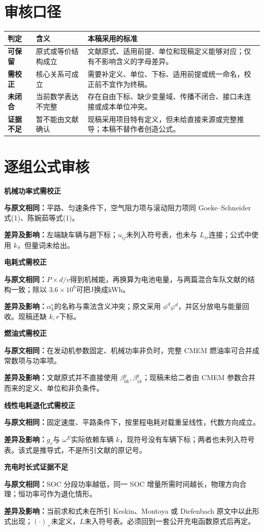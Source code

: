 \documentclass[UTF8,11pt,a4paper,fontset=none]{ctexart}
\newcommand{\pass}{\textcolor{okgreen}{\textbf{可保留}}}
\newcommand{\revise}{\textcolor{warnorange}{\textbf{需校正}}}
\newcommand{\fail}{\textcolor{badred}{\textbf{未闭合}}}
\newcommand{\unknown}{\textbf{证据不足}}
\newcommand{\audititem}[4]{%
  \noindent\textbf{#1}\hfill #2\par
  \noindent\textbf{与原文相同：}#3\par
  \noindent\textbf{差异及影响：}#4\par\medskip
}
\begin{document}
\section{审核口径}

\begin{longtable}{P{0.16\textwidth}P{0.19\textwidth}P{0.56\textwidth}}
\toprule
判定 & 含义 & 本稿采用的标准\\
\midrule
\endhead
\pass & 原式或等价结构成立 & 文献原式、适用前提、单位和现稿定义能够对应；仅有不影响含义的字母差异。\\
\revise & 核心关系可成立 & 需要补定义、单位、下标、适用前提或统一命名，校正前不宜作为终稿。\\
\fail & 当前数学表达不完整 & 存在自由下标、缺少变量域、传播不闭合、接口未连接或成本单位冲突。\\
\unknown & 暂不能由文献确认 & 现稿采用项目特有定义，但未给直接来源或完整推导；本稿不替作者创造公式。\\
\bottomrule
\end{longtable}

\section{逐组公式审核}

\audititem{机械功率式}{\revise}
{平路、匀速条件下，空气阻力项与滚动阻力项同 Goeke--Schneider 式(1)、陈婉茹等式(1)。}
{左端缺车辆与趟下标；$u_{ij}$未列入符号表，也未与 $L_{ir}$连接；公式中使用 $k$，但量词未给出。}

\audititem{电耗式}{\revise}
{$P\times d/v$得到机械能，再换算为电池电量，与两篇混合车队文献的结构一致；除以 $3.6\times10^6$可把J换成kWh。}
{$\alpha_k^e$的名称与乘法含义冲突；原文采用 $\phi^d\varphi^d$，并区分放电与能量回收。现稿还缺 $k,r$下标。}

\audititem{燃油式}{\revise}
{在发动机参数固定、机械功率非负时，完整 CMEM 燃油率可合并成常数项与功率项。}
{文献原式并不直接使用 $\beta_{0k}^g,\beta_{1k}^g$；现稿未给二者由 CMEM 参数合并而来的定义、单位和非负条件。}

\audititem{线性电耗退化式}{\revise}
{固定速度、平路条件下，按里程电耗对载重呈线性，代数方向成立。}
{$g_v$与 $\omega^E$实际依赖车辆 $k$，现符号没有车辆下标；两者也未列入符号表。该式是推导式，不是所引文献的原记号。}

\audititem{充电时长式}{\unknown}
{SOC 分段功率越低，同一 SOC 增量所需时间越长，物理方向合理；恒功率可作为退化情形。}
{当前求和式未在所引 Keskin、Montoya 或 Diefenbach 原文中以此形式出现；$(\cdot)_+$未定义，$L$未入符号表。必须回到一套公开充电函数原式后再定。}
\end{document}

